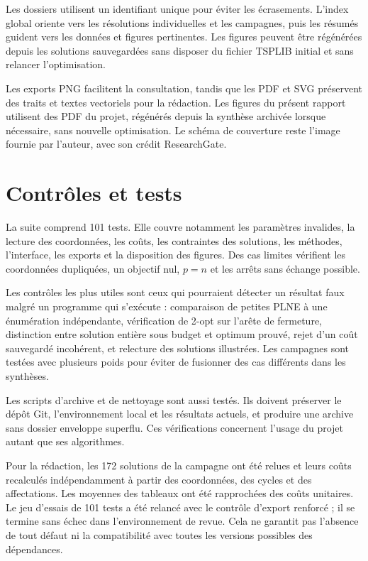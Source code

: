 Les dossiers utilisent un identifiant unique pour éviter les écrasements.
L'index global oriente vers les résolutions individuelles et les campagnes,
puis les résumés guident vers les données et figures pertinentes. Les
figures peuvent être régénérées depuis les solutions sauvegardées sans
disposer du fichier TSPLIB initial et sans relancer l'optimisation.

Les exports PNG facilitent la consultation, tandis que les PDF et SVG
préservent des traits et textes vectoriels pour la rédaction. Les figures
du présent rapport utilisent des PDF du projet, régénérés depuis la synthèse
archivée lorsque nécessaire, sans nouvelle optimisation. Le schéma
de couverture reste l'image fournie par l'auteur, avec son crédit ResearchGate.

\section{Contrôles et tests}
La suite comprend 101 tests. Elle couvre notamment les paramètres invalides,
la lecture des coordonnées, les coûts, les contraintes des solutions,
les méthodes, l'interface, les exports et la disposition des figures.
Des cas limites vérifient les coordonnées dupliquées, un objectif nul,
$p=n$ et les arrêts sans échange possible.

Les contrôles les plus utiles sont ceux qui pourraient détecter un résultat
faux malgré un programme qui s'exécute : comparaison de petites PLNE à une
énumération indépendante, vérification de 2-opt sur l'arête de fermeture,
distinction entre solution entière sous budget et optimum prouvé, rejet
d'un coût sauvegardé incohérent, et relecture des solutions illustrées.
Les campagnes sont testées avec plusieurs poids pour éviter de fusionner
des cas différents dans les synthèses.

Les scripts d'archive et de nettoyage sont aussi testés. Ils doivent préserver
le dépôt Git, l'environnement local et les résultats actuels, et produire
une archive sans dossier enveloppe superflu. Ces vérifications concernent
l'usage du projet autant que ses algorithmes.

Pour la rédaction, les 172 solutions de la campagne ont été relues et leurs
coûts recalculés indépendamment à partir des coordonnées, des cycles et
des affectations. Les moyennes des tableaux ont été rapprochées des coûts
unitaires. Le jeu d'essais de 101 tests a été relancé avec le contrôle
d'export renforcé ; il se termine sans échec dans l'environnement de revue.
Cela ne garantit pas l'absence de tout défaut ni la compatibilité avec
toutes les versions possibles des dépendances.

